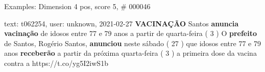 \begin{frame}{Examples: Dimension 4 pos, score 5, \# 000046}
\footnotesize
\begin{exampleblock}{text: t062254, user: unknown, 2021-02-27}
\textbf{VACINAÇÃO}  Santos \textbf{anuncia} 
\textbf{vacinação} de idosos entre 77 e 79 anos a partir de quarta-feira ( 3 ) 
 O \textbf{prefeito} de Santos, Rogério Santos, 
\textbf{anunciou} neste sábado ( 27 ) que idosos entre 77 e 79 anos 
\textbf{receberão} a partir da próxima quarta-feira ( 3 ) a primeira dose da 
vacina contra a https://t.co/yg5I2iwS1b 
\end{exampleblock}
\end{frame}
